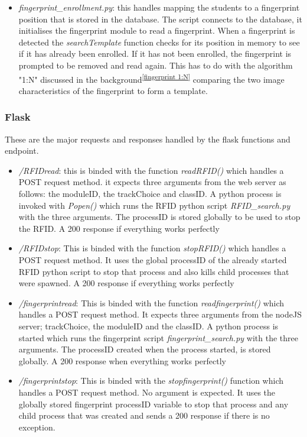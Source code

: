 \begin{itemize}
 \item \textit{fingerprint\_enrollment.py}: this handles mapping the students to a fingerprint position that is stored in the database. The script connects to the database, it initialises the fingerprint module to read a fingerprint.\label{fingerprint} When a fingerprint is detected the \textit{searchTemplate} function checks for its position in memory to see if it has already been enrolled. If it has not been enrolled, the fingerprint is prompted to be removed and read again. This has to do with the algorithm "1:N" discussed in the background\textsuperscript{\ref{fingerprint 1:N}} comparing the two image characteristics of the fingerprint to form a template.
\end{itemize}
 
\subsubsection*{Flask}
These are the major requests and responses handled by the flask functions and endpoint.
\begin{itemize}
\item \textit{/RFIDread}: this is binded with the function \textit{readRFID()} which handles a POST request method. it expects three arguments from the web server as follows: the moduleID, the trackChoice and classID. A python process is invoked with \textit{Popen()} which runs the RFID python script \textit{RFID\_search.py} with the three arguments. The processID is stored globally to be used to stop the \gls{RFID}. A 200 response if everything works perfectly
\item \textit{/RFIDstop}: This is binded with the function \textit{stopRFID()} which handles a POST request method. It uses the global processID of the already started RFID python script to stop that process and also kills child processes that were spawned. A 200 response if everything works perfectly
\item \textit{/fingerprintread}: This is binded with the function \textit{readfingerprint()} which handles a POST request method. It expects three arguments from the nodeJS server; trackChoice, the moduleID and the classID. A python process is started which runs the fingerprint script \textit{fingerprint\_search.py} with the three arguments. The processID created when the process started, is stored globally. A 200 response when everything works perfectly
\item \textit{/fingerprintstop}: This is binded with the \textit{stopfingerprint()} function which handles a POST request method. No argument is expected. It uses the globally stored fingerprint processID variable to stop that process and any child process that was created and sends a 200 response if there is no exception.
\end{itemize}

